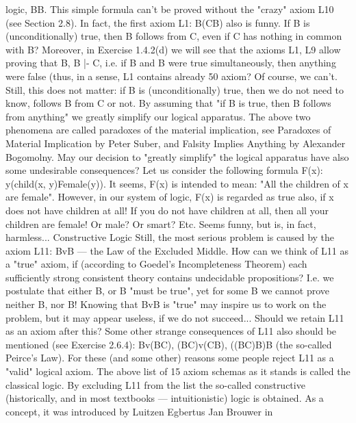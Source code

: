 logic, \neg \neg B\IMPLIES B. This simple formula can't be proved without the "crazy" axiom L10 (see Section 2.8).
In fact, the first axiom L1: B\IMPLIES (C\IMPLIES B) also is funny. If B is (unconditionally) true, then B follows from C,
even if C has nothing in common with B? Moreover, in Exercise 1.4.2(d) we will see that the axioms L1,
L9 allow proving that \neg B, B |- \neg C, i.e. if \neg B and B were true simultaneously, then anything were false
(thus, in a sense, L1 contains already 50%
axiom? Of course, we can't. Still, this does not matter: if B is (unconditionally) true, then we do not need
to know, follows B from C or not. By assuming that "if B is true, then B follows from anything" we
greatly simplify our logical apparatus.
The above two phenomena are called paradoxes of the material implication, see Paradoxes of Material
Implication by Peter Suber, and Falsity Implies Anything by Alexander Bogomolny.
May our decision to "greatly simplify" the logical apparatus have also some undesirable consequences?
Let us consider the following formula F(x): \forall y(child(x, y)\IMPLIES Female(y)). It seems, F(x) is intended to
mean: "All the children of x are female". However, in our system of logic, F(x) is regarded as true also, if
x does not have children at all! If you do not have children at all, then all your children are female! Or
male? Or smart? Etc. Seems funny, but is, in fact, harmless...
Constructive Logic
Still, the most serious problem is caused by the axiom L11: Bv\neg B --- the Law of the Excluded Middle.
How can we think of L11 as a "true" axiom, if (according to Goedel's Incompleteness Theorem) each
sufficiently strong consistent theory contains undecidable propositions? I.e. we postulate that either B, or
\neg B "must be true", yet for some B we cannot prove neither B, nor \neg B! Knowing that Bv\neg B is "true" may
inspire us to work on the problem, but it may appear useless, if we do not succeed... Should we retain L11
as an axiom after this?
Some other strange consequences of L11 also should be mentioned (see Exercise 2.6.4):
Bv(B\IMPLIES C),
(B\IMPLIES C)v(C\IMPLIES B),
((B\IMPLIES C)\IMPLIES B)\IMPLIES B (the so-called Peirce's Law).
For these (and some other) reasons some people reject L11 as a "valid" logical axiom.
The above list of 15 axiom schemas as it stands is called the classical logic.
By excluding L11 from the list the so-called constructive (historically, and in most textbooks ---
intuitionistic) logic is obtained. As a concept, it was introduced by Luitzen Egbertus Jan Brouwer in
